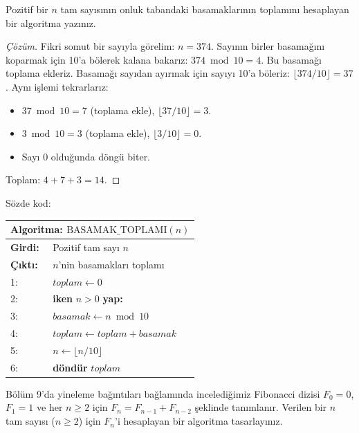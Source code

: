 \begin{example}
Pozitif bir $n$ tam sayısının onluk tabandaki basamaklarının toplamını hesaplayan bir algoritma yazınız.
\end{example}

\begin{proof}[Çözüm]
Fikri somut bir sayıyla görelim: $n = 374$.
Sayının birler basamağını koparmak için 10'a bölerek kalana bakarız: $374 \bmod 10 = 4$.
Bu basamağı toplama ekleriz.
Basamağı sayıdan ayırmak için sayıyı 10'a böleriz: $\lfloor 374 / 10 \rfloor = 37$.
Aynı işlemi tekrarlarız:
\begin{itemize}
    \item $37 \bmod 10 = 7$ (toplama ekle), $\lfloor 37 / 10 \rfloor = 3$.
    \item $3 \bmod 10 = 3$ (toplama ekle), $\lfloor 3 / 10 \rfloor = 0$.
    \item Sayı $0$ olduğunda döngü biter.
\end{itemize}
Toplam: $4 + 7 + 3 = 14$.
\end{proof}

Sözde kod:
\begin{center}
\begin{minipage}{1.0\textwidth}
\begin{tabular}{p{2.4cm}p{9.4cm}}
\hline
\multicolumn{2}{l}{\textbf{Algoritma:} $\text{BASAMAK\_TOPLAMI}(n)$} \\
\hline
\textbf{Girdi:} & Pozitif tam sayı $n$ \\
\textbf{Çıktı:} & $n$'nin basamakları toplamı \\
1: & $toplam \leftarrow 0$ \\
2: & \textbf{iken} $n > 0$ \textbf{yap:} \\
3: & \quad $basamak \leftarrow n \bmod 10$ \\
4: & \quad $toplam \leftarrow toplam + basamak$ \\
5: & \quad $n \leftarrow \lfloor n / 10 \rfloor$ \\
6: & \textbf{döndür} $toplam$ \\
\hline
\end{tabular}
\end{minipage}
\end{center}

\begin{example}
Bölüm 9'da yineleme bağıntıları bağlamında incelediğimiz Fibonacci dizisi $F_0 = 0$, $F_1 = 1$ ve her $n \ge 2$ için $F_n = F_{n-1} + F_{n-2}$ şeklinde tanımlanır. Verilen bir $n$ tam sayısı ($n \ge 2$) için $F_n$'i hesaplayan bir algoritma tasarlayınız.
\end{example}

